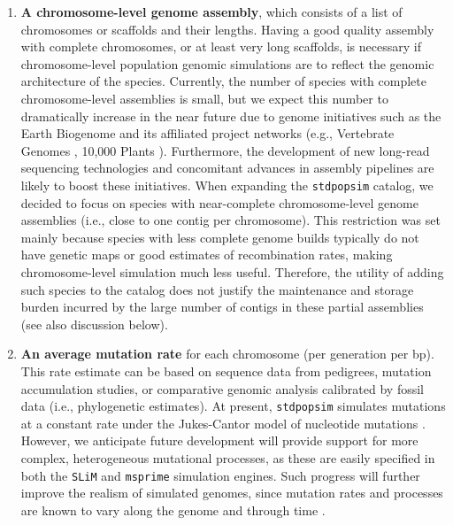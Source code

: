\documentclass[hidelinks]{article}
\newcommand{\stdpopsim}{\texttt{stdpopsim}\xspace}
\begin{document}
\begin{enumerate}
\def\labelenumi{\arabic{enumi}.}

\item
  \textbf{A chromosome-level genome assembly}, which consists of a list of chromosomes or scaffolds and their lengths. 
  Having a good quality assembly with complete chromosomes, or at least very long scaffolds, 
  is necessary if chromosome-level population genomic simulations are to reflect the genomic architecture of the species.
  Currently, the number of species with complete chromosome-level assemblies is small,
  but we expect this number to dramatically increase in the near future due to genome initiatives 
  such as the Earth Biogenome \citep{Lewin2022} and its affiliated project networks (e.g.,
  Vertebrate Genomes \citep{Rhie2021}, 10,000 Plants \citep{Cheng2018}).
  Furthermore, the development of new long-read sequencing technologies
  \citep{Amarasinghe2020,Amarasinghe2021} and concomitant advances in assembly pipelines
  \citep{Chakraborty2016} are likely to boost these initiatives. 
  When expanding the \stdpopsim catalog, we decided to focus on species with near-complete 
  chromosome-level genome assemblies (i.e., close to one contig per chromosome).
  This restriction was set mainly because species with less complete genome builds 
  typically do not have genetic maps or good estimates of recombination rates, 
  making chromosome-level simulation much less useful. 
  Therefore, the utility of adding such species to the catalog does not justify the 
  maintenance and storage burden incurred by the large number of contigs in these partial assemblies (see also discussion below).

\item
  \textbf{An average mutation rate} for each chromosome (per generation per bp).
  This rate estimate can be based on sequence data from pedigrees, mutation accumulation studies, 
  or comparative genomic analysis calibrated by fossil data (i.e., phylogenetic estimates).
  At present, \stdpopsim simulates mutations at a constant rate under the Jukes-Cantor model of nucleotide mutations \citep{Jukes1969}.
  However, we anticipate future development will provide support for more complex, heterogeneous mutational processes,
  as these are easily specified in both the \texttt{SLiM} and \texttt{msprime} simulation engines.
  Such progress will further improve the realism of simulated genomes,
  since mutation rates and processes are known to vary along the genome and through time \citep{Benzer1961,Ellegren2003,Supek2019}.


\end{enumerate}
\end{document}

